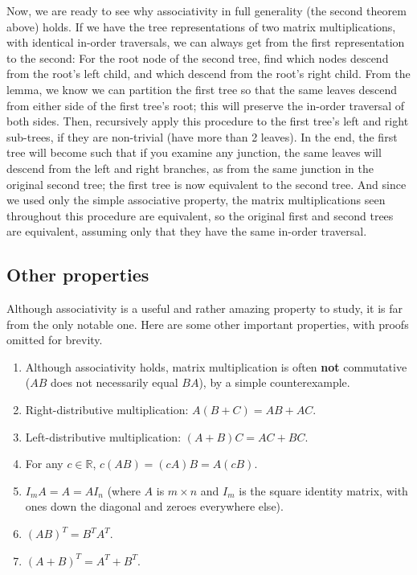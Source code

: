 \documentclass[draft,12pt]{report}
\begin{document}
Now, we are ready to see why associativity in full generality (the second theorem above) holds. If we have the tree representations of two matrix multiplications, with identical in-order traversals, we can always get from the first representation to the second: For the root node of the second tree, find which nodes descend from the root's left child, and which descend from the root's right child. From the lemma, we know we can partition the first tree so that the same leaves descend from either side of the first tree's root; this will preserve the in-order traversal of both sides. Then, recursively apply this procedure to the first tree's left and right sub-trees, if they are non-trivial (have more than 2 leaves). In the end, the first tree will become such that if you examine any junction, the same leaves will descend from the left and right branches, as from the same junction in the original second tree; the first tree is now equivalent to the second tree. And since we used only the simple associative property, the matrix multiplications seen throughout this procedure are equivalent, so the original first and second trees are equivalent, assuming only that they have the same in-order traversal.

\subsection{Other properties}

Although associativity is a useful and rather amazing property to study, it is far from the only notable one. Here are some other important properties, with proofs omitted for brevity.

\begin{enumerate}
    \item Although associativity holds, matrix multiplication is often \textbf{not} commutative ($AB$ does not necessarily equal $BA$), by a simple counterexample.
    \item Right-distributive multiplication: $A(B + C) = AB + AC$.
    \item Left-distributive multiplication: $(A + B)C = AC + BC$.
    \item For any $c \in \mathbb R$, $c(AB) = (cA)B = A(cB)$.
    \item $I_mA = A = AI_n$ (where $A$ is $m \times n$ and $I_m$ is the square identity matrix, with ones down the diagonal and zeroes everywhere else).
    \item $(AB)^T = B^T A^T$.
    \item $(A + B)^T = A^T + B^T$.
\end{enumerate}
\end{document}
